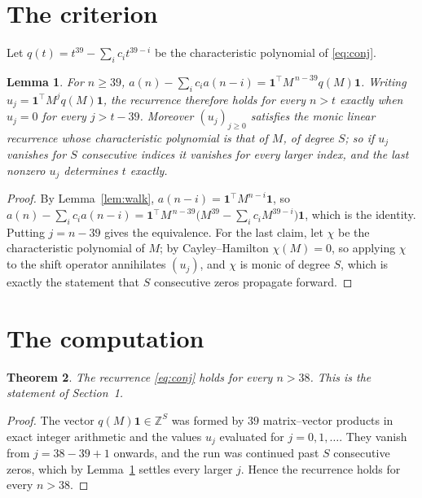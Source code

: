 \documentclass[11pt,a4paper]{article}
\theoremstyle{plain}
\newtheorem{theorem}{Theorem}
\newtheorem{lemma}[theorem]{Lemma}
\theoremstyle{definition}
\begin{document}
\section{The criterion}

Let $q(t)=t^{39}-\sum_i c_i t^{39-i}$ be the characteristic polynomial of
\eqref{eq:conj}.

\begin{lemma}\label{lem:crit}
For $n\ge39$,
$a(n)-\sum_i c_i a(n-i)=\mathbf{1}^{\!\top}M^{\,n-39}q(M)\mathbf{1}$. Writing
$u_j=\mathbf{1}^{\!\top}M^{j}q(M)\mathbf{1}$, the recurrence therefore holds for every
$n>t$ exactly when $u_j=0$ for every $j>t-39$. Moreover $(u_j)_{j\ge0}$ satisfies the
monic linear recurrence whose characteristic polynomial is that of $M$, of degree $S$; so
if $u_j$ vanishes for $S$ consecutive indices it vanishes for every larger index, and the
last nonzero $u_j$ determines $t$ exactly.
\end{lemma}

\begin{proof}
By Lemma~\ref{lem:walk}, $a(n-i)=\mathbf{1}^{\!\top}M^{n-i}\mathbf{1}$, so
$a(n)-\sum_i c_i a(n-i)
=\mathbf{1}^{\!\top}M^{\,n-39}\bigl(M^{39}-\sum_i c_i M^{39-i}\bigr)
\mathbf{1}$, which is the identity. Putting $j=n-39$ gives the equivalence. For the
last claim, let $\chi$ be the characteristic polynomial of $M$; by Cayley--Hamilton
$\chi(M)=0$, so applying $\chi$ to the shift operator annihilates $(u_j)$, and $\chi$ is
monic of degree $S$, which is exactly the statement that $S$ consecutive zeros propagate
forward.
\end{proof}

\section{The computation}

\begin{theorem}
The recurrence \eqref{eq:conj} holds for every $n>38$. This is the statement of
Section~1.
\end{theorem}

\begin{proof}
The vector $q(M)\mathbf{1}\in\mathbb{Z}^{S}$ was formed by $39$ matrix--vector
products in exact integer arithmetic and the values $u_j$ evaluated for
$j=0,1,\dots$. They vanish from $j=38-39+1$ onwards, and the run was continued past
$S$ consecutive zeros, which by Lemma~\ref{lem:crit} settles every larger $j$. Hence the
recurrence holds for every $n>38$.
\end{proof}
\end{document}

